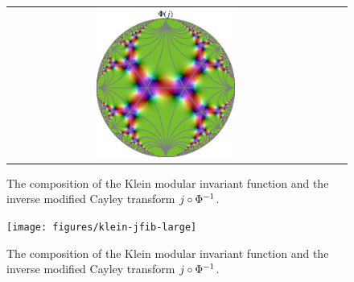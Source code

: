 \begin{figure}
\begin{tabular}{c c c}
\includegraphics[width=0.45\textwidth]{figures/klein-j-mod-cayley}
\end{tabular}
\caption{The composition of the Klein modular invariant function and the inverse modified Cayley transform $j \circ {\Phi}^{-1}$.}
\label{fig_FunctionsOfJ}
\end{figure}

\begin{figure}
\centering
\texttt{[image: figures/klein-jfib-large]}
\caption{The composition of the Klein modular invariant function and the inverse modified Cayley transform $j \circ {\Phi}^{-1}$.}
\label{fig_KleinJ_Fib}
\end{figure}

